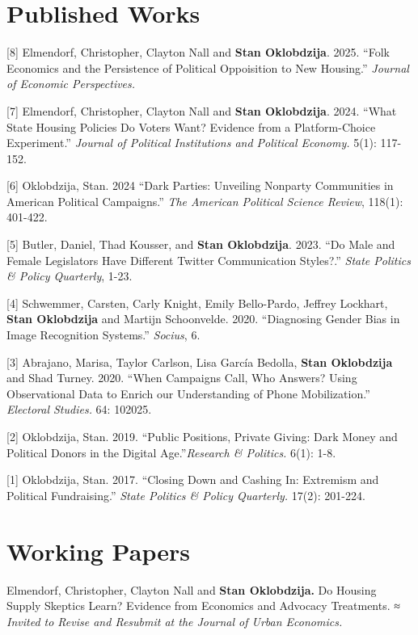 \documentclass[margin,line]{res}
\begin{document}
\begin{resume}
\section{\sc Published Works}


[8] Elmendorf, Christopher, Clayton Nall and \textbf{Stan Oklobdzija}. 2025. ``Folk Economics and the Persistence of Political Oppoisition to New Housing.'' \textit{Journal of Economic Perspectives.}

[7] Elmendorf, Christopher, Clayton Nall and \textbf{Stan Oklobdzija}. 2024. ``What State Housing Policies Do Voters Want? Evidence from a Platform-Choice Experiment.'' \textit{Journal of Political Institutions and Political Economy.} 5(1): 117-152.

[6] Oklobdzija, Stan. 2024 ``Dark Parties: Unveiling Nonparty Communities in American Political Campaigns.'' \textit{The American Political Science Review}, 118(1): 401-422.  

[5] Butler, Daniel, Thad Kousser, and \textbf{Stan Oklobdzija}. 2023. ``Do Male and Female Legislators Have Different Twitter Communication Styles?.'' \textit{State Politics \& Policy Quarterly}, 1-23.
 
[4] Schwemmer, Carsten, Carly Knight, Emily Bello-Pardo, Jeffrey Lockhart, \textbf{Stan Oklobdzija} and Martijn Schoonvelde. 2020. ``Diagnosing Gender Bias in Image Recognition Systems.'' \textit{Socius}, 6. 

[3] Abrajano, Marisa, Taylor Carlson, Lisa Garc\'ia Bedolla, \textbf{Stan Oklobdzija} and Shad Turney. 2020. ``When Campaigns Call, Who Answers? Using Observational Data to Enrich our Understanding of Phone Mobilization.''  \textit{Electoral Studies.} 64: 102025.

[2] Oklobdzija, Stan. 2019. ``Public Positions, Private Giving: Dark Money and Political Donors in the Digital Age.''\textit{Research \& Politics.} 6(1): 1-8.

[1] Oklobdzija, Stan. 2017. ``Closing Down and Cashing In: Extremism and Political Fundraising.'' \textit{State Politics \& Policy Quarterly.} 17(2): 201-224.



\section{\sc Working Papers}


Elmendorf, Christopher, Clayton Nall and \textbf{Stan Oklobdzija.} Do Housing Supply Skeptics Learn? Evidence from Economics and Advocacy Treatments. ≈ \textit{Invited to Revise and Resubmit at the Journal of
Urban Economics.}


\end{resume}
\end{document}
